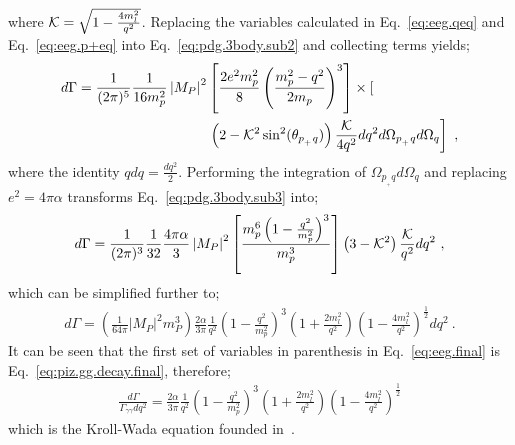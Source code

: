 where ${\cal K} = \sqrt{1 - \frac{4m_l^2}{q^2}}$. Replacing the variables calculated in Eq.~\ref{eq:eeg.qeq} and Eq.~\ref{eq:eeg.p+eq} into Eq.~\ref{eq:pdg.3body.sub2} and collecting terms yields;
\begin{align}\label{eq:pdg.3body.sub3}
d\Gamma = \frac{1}{(2 \pi)^5} \frac{1}{16 m_p^2} \left|M_{P}\right|^{2} & \left[ \frac{2e^2 m_p^2}{8} \left( \frac{m_p^2 - q^2}{2 m_p}\right)^3\right] \times \nonumber \left[ \right. \\ &  \left.
\left( 2 -{\cal K}^2\sin^2(\theta_{p_{_+}q})\right)\frac{{\cal K}}{4 q^2}dq^2d\Omega_{p_{_+}q}d\Omega_q \right] \ ,
\end{align}
where the identity $qdq = \frac{dq^2}{2}$. Performing the integration of $\Omega_{p_{_+}q}d\Omega_q$ and replacing $e^2 = 4\pi\alpha$ transforms Eq.~\ref{eq:pdg.3body.sub3} into;
\begin{align}\label{eq:pdg.3body.sub4}
d\Gamma = \frac{1}{(2 \pi)^3} \frac{1}{32} \frac{4 \pi \alpha}{3} \left|M_{P}\right|^{2} \left[ \frac{m_p^6 \left( 1- \frac{q^2}{m_p^2}\right)^3}{m_p^3} \right]\left( 3 -{\cal K}^2\right)\frac{{\cal K}}{q^2}dq^2\ ,
\end{align}
which can be simplified further to;
\begin{align}\label{eq:eeg.final}
d\Gamma = \left(\frac{1}{64\pi} \left|M_{P}\right|^{2}m_{P}^{3} \right) \frac{2 \alpha}{3 \pi} \frac{1}{q^2} \left( 1- \frac{q^2}{m_p^2}\right)^3 \left( 1+ \frac{2m_l^2}{q^2}\right) \left( 1- \frac{4m_l^2}{q^2}\right)^{\frac{1}{2}} dq^2\ .
\end{align}
It can be seen that the first set of variables in parenthesis in Eq.~\ref{eq:eeg.final} is Eq.~\ref{eq:piz.gg.decay.final}, therefore;
\begin{align}\label{eq:eegff.finalkroll}
\frac{d\Gamma}{\Gamma_{\gamma\gamma} dq^2} = \frac{2 \alpha}{3 \pi} \frac{1}{q^2} \left( 1- \frac{q^2}{m_p^2}\right)^3 \left( 1+ \frac{2m_l^2}{q^2}\right) \left( 1- \frac{4m_l^2}{q^2}\right)^{\frac{1}{2}} 
\end{align}
which is the Kroll-Wada equation founded in~\cite{KrollWada}.
